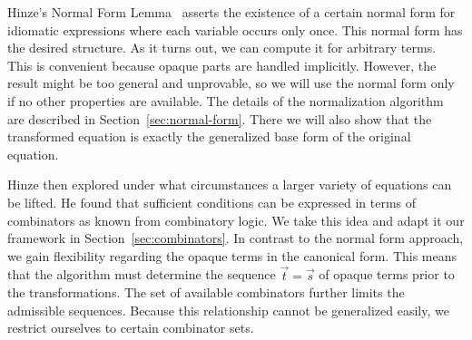 Hinze's Normal Form Lemma~\cite[7]{hinze10} asserts the existence of a certain
normal form for idiomatic expressions where each variable occurs only once.
This normal form has the desired structure.
As it turns out, we can compute it for arbitrary terms.
This is convenient because opaque parts are handled implicitly.
However, the result might be too general and unprovable, so we will use the
normal form only if no other properties are available.
The details of the normalization algorithm are described in
Section~\ref{sec:normal-form}.
There we will also show that the transformed equation is exactly the generalized
base form of the original equation.

Hinze then explored under what circumstances a larger variety of equations can
be lifted.
He found that sufficient conditions can be expressed in terms of combinators
as known from combinatory logic.
We take this idea and adapt it our framework in Section~\ref{sec:combinators}.
In contrast to the normal form approach, we gain flexibility regarding the
opaque terms in the canonical form.
This means that the algorithm must determine the sequence $\vec t = \vec s$
of opaque terms prior to the transformations.
The set of available combinators further limits the admissible sequences.
Because this relationship cannot be generalized easily, we restrict ourselves
to certain combinator sets.
